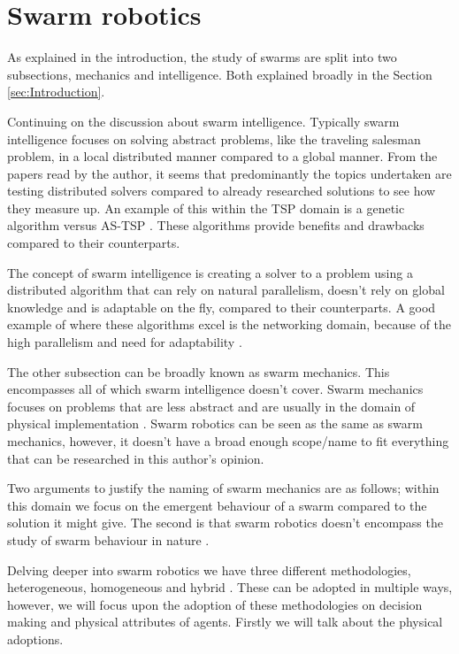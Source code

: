 \documentclass{UoYCSproject}
\begin{document}
\section{Swarm robotics}
\label{sec:Robotics}

As explained in the introduction, the study of swarms are split into two subsections, mechanics and intelligence. 
Both explained broadly in the Section \ref{sec:Introduction}. 

Continuing on the discussion about swarm intelligence. 
Typically swarm intelligence focuses on solving abstract problems, like the traveling salesman problem, in a local distributed manner compared to a global manner. 
From the papers read by the author, it seems that predominantly the topics undertaken are testing distributed solvers compared to already researched solutions to see how they measure up. 
An example of this within the TSP domain is a genetic algorithm versus AS-TSP \cite{Swarm intellegiegence}. 
These algorithms provide benefits and drawbacks compared to their counterparts.

The concept of swarm intelligence is creating a solver to a problem using a distributed algorithm that can rely on natural parallelism, doesn't rely on global knowledge and is adaptable on the fly, compared to their counterparts. 
A good example of where these algorithms excel is the networking domain, because of the high parallelism and need for adaptability \cite{Swarm intellegiegence}.

The other subsection can be broadly known as swarm mechanics. 
This encompasses all of which swarm intelligence doesn’t cover. 
Swarm mechanics focuses on problems that are less abstract and are usually in the domain of physical implementation \cite{Cognitive maps mine detection, Probabalitic automata foraging robots}. 
Swarm robotics can be seen as the same as swarm mechanics, however, it doesn’t have a broad enough scope/name to fit everything that can be researched in this author's opinion.

Two arguments to justify the naming of swarm mechanics are as follows; within this domain we focus on the emergent behaviour of a swarm compared to the solution it might give. 
The second is that swarm robotics doesn’t encompass the study of swarm behaviour in nature \cite{Swarm intellegiegence, Ant communication}.

Delving deeper into swarm robotics we have three different methodologies, heterogeneous, homogeneous and hybrid \cite{Swarm robotics reviewed}. 
These can be adopted in multiple ways, however, we will focus upon the adoption of these methodologies on decision making and physical attributes of agents. 
Firstly we will talk about the physical adoptions.
\end{document}
